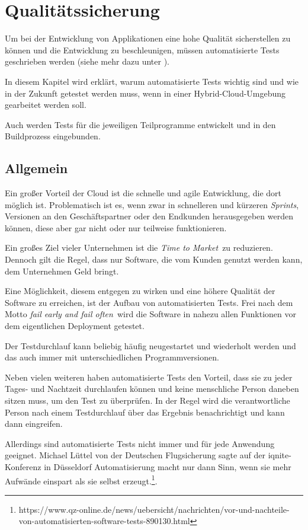 \chapter{Qualitätssicherung}
\label{cha:qualitaetssicherung}
Um bei der Entwicklung von Applikationen eine hohe Qualität sicherstellen zu können und die Entwicklung zu beschleunigen,
müssen automatisierte Tests geschrieben werden (siehe mehr dazu unter \cite{online_quali_automatisiertetests}).

In diesem Kapitel wird erklärt, warum automatisierte Tests wichtig sind und wie in der Zukunft getestet werden muss, wenn
in einer Hybrid-Cloud-Umgebung gearbeitet werden soll.

Auch werden Tests für die jeweiligen Teilprogramme entwickelt und in den Buildprozess eingebunden.

\section{Allgemein}
Ein großer Vorteil der Cloud ist die schnelle und agile Entwicklung, die dort möglich ist. Problematisch ist es, wenn
zwar in schnelleren und kürzeren \textit{Sprints}, Versionen an den Geschäftspartner oder den Endkunden herausgegeben
werden können, diese aber gar nicht oder nur teilweise funktionieren.

Ein großes Ziel vieler Unternehmen ist die \glqq \textit{Time to Market}\grqq~zu reduzieren. Dennoch gilt die Regel,
dass nur Software, die vom Kunden genutzt werden kann, dem Unternehmen Geld bringt.

Eine Möglichkeit, diesem entgegen zu wirken und eine höhere Qualität der Software zu erreichen, ist der Aufbau von
automatisierten Tests. Frei nach dem Motto \glqq \textit{fail early and fail often}\grqq~wird die Software in nahezu
allen Funktionen vor dem eigentlichen Deployment getestet.

Der Testdurchlauf kann beliebig häufig neugestartet und wiederholt werden und das auch immer mit unterschiedlichen
Programmversionen.

Neben vielen weiteren haben automatisierte Tests den Vorteil, dass sie zu jeder Tages- und Nachtzeit durchlaufen
können und keine menschliche Person daneben sitzen muss, um den Test zu überprüfen. In der Regel wird die verantwortliche
Person nach einem Testdurchlauf über das Ergebnis benachrichtigt und kann dann eingreifen.

Allerdings sind automatisierte Tests nicht immer und für jede Anwendung geeignet. Michael Lüttel von der Deutschen
Flugsicherung sagte auf der iqnite-Konferenz in Düsseldorf \glqq Automatisierung macht nur dann Sinn, wenn sie mehr Aufwände
einspart als sie selbst erzeugt.\grqq\footnote{https://www.qz-online.de/news/uebersicht/nachrichten/vor-und-nachteile-von-automatisierten-software-tests-890130.html}.

